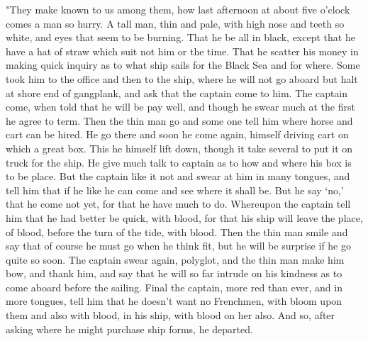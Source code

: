"They make known to us among them, how last afternoon at about five o'clock comes a man so hurry. A tall man, thin and pale, with high nose and teeth so white, and eyes that seem to be burning. That he be all in black, except that he have a hat of straw which suit not him or the time. That he scatter his money in making quick inquiry as to what ship sails for the Black Sea and for where. Some took him to the office and then to the ship, where he will not go aboard but halt at shore end of gangplank, and ask that the captain come to him. The captain come, when told that he will be pay well, and though he swear much at the first he agree to term. Then the thin man go and some one tell him where horse and cart can be hired. He go there and soon he come again, himself driving cart on which a great box. This he himself lift down, though it take several to put it on truck for the ship. He give much talk to captain as to how and where his box is to be place. But the captain like it not and swear at him in many tongues, and tell him that if he like he can come and see where it shall be. But he say `no,' that he come not yet, for that he have much to do. Whereupon the captain tell him that he had better be quick, with blood, for that his ship will leave the place, of blood, before the turn of the tide, with blood. Then the thin man smile and say that of course he must go when he think fit, but he will be surprise if he go quite so soon. The captain swear again, polyglot, and the thin man make him bow, and thank him, and say that he will so far intrude on his kindness as to come aboard before the sailing. Final the captain, more red than ever, and in more tongues, tell him that he doesn't want no Frenchmen, with bloom upon them and also with blood, in his ship, with blood on her also. And so, after asking where he might purchase ship forms, he departed. 

